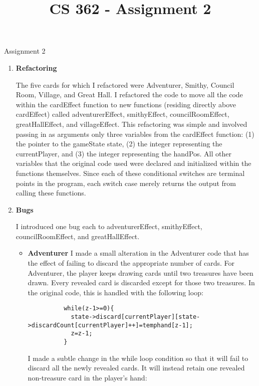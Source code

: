 \documentclass[11pt,letterpaper]{article}
\begin{document}
 \univlogo

\title{CS 362 - Assignment 2}
{\Huge Assignment 2}\\[5mm]
\begin{enumerate}
  \item \textbf{Refactoring}

    The five cards for which I refactored were Adventurer, Smithy, 
    Council Room, Village, and Great Hall. 
    I refactored the code to move all the code within the cardEffect function
    to new functions (residing directly above cardEffect) called
    adventurerEffect, smithyEffect, councilRoomEffect, greatHallEffect, and 
    villageEffect. This refactoring was
    simple and involved passing in as arguments only three variables from the
    cardEffect function: (1) the pointer to the gameState state, (2) the integer 
    representing the currentPlayer, and (3) the integer representing the handPos. All other
    variables that the original code used were declared and initialized 
    within the functions themselves. Since each of these conditional switches
    are terminal points in the program, each switch case merely returns the
    output from calling these functions. 

  \item \textbf{Bugs}

    I introduced one bug each to adventurerEffect, smithyEffect, councilRoomEffect, and greatHallEffect. 

    \begin{itemize}[leftmargin=*]
      \item \textbf{Adventurer}
        I made a small alteration in the Adventurer code that has the effect of failing to discard the
        appropriate number of cards. For Adventurer, the player keeps drawing cards until two treasures
        have been drawn. Every revealed card is discarded except for those two treasures. In the original code, 
        this is handled with the following loop: 

        \begin{lstlisting}
          while(z-1>=0){
            state->discard[currentPlayer][state->discardCount[currentPlayer]++]=temphand[z-1];
            z=z-1;
          }
        \end{lstlisting}
        
        I made a subtle change in the while loop condition so that it will fail to discard
        all the newly revealed cards. It will instead retain one revealed non-treasure 
        card in the player's hand:


\end{itemize}
\end{enumerate}
\end{document}
